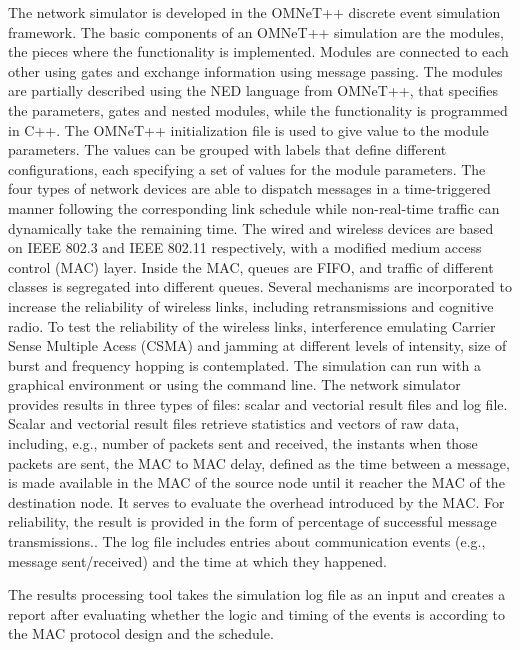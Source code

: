 \documentclass[conference]{IEEEtran}
\begin{document}
The network simulator is developed in the OMNeT++ discrete event simulation framework. The basic components of an OMNeT++ simulation are the modules, the pieces where the functionality is implemented. Modules are connected to each other using gates and exchange information using message passing. The modules are partially described using the NED language from OMNeT++, that specifies the parameters, gates and nested modules, while the functionality is programmed in C++. The OMNeT++ initialization file is used to give value to the module parameters. The values can be grouped with labels that define different configurations, each specifying a set of values for the module parameters. The four types of network devices are able to dispatch messages in a time-triggered manner following the corresponding link schedule while non-real-time traffic can dynamically take the remaining time. The wired and wireless devices are based on IEEE 802.3 and IEEE 802.11 respectively, with a modified medium access control (MAC) layer. Inside the MAC, queues are FIFO, and traffic of different classes is segregated into different queues. Several mechanisms are incorporated to increase the reliability of wireless links, including retransmissions and cognitive radio. To test the reliability of the wireless links, interference emulating Carrier Sense Multiple Acess (CSMA) and jamming at different levels of intensity, size of burst and frequency hopping is contemplated. The simulation can run with a graphical environment or using the command line. The network simulator provides results in three types of files: scalar and vectorial result files and log file. Scalar and vectorial result files retrieve statistics and vectors of raw data, including, e.g., number of packets sent and received, the instants when those packets are sent, the MAC to MAC delay, defined as the time between a message, is made available in the MAC of the source node until it reacher the MAC of the destination node. It serves to evaluate the overhead introduced by the MAC. For reliability, the result is provided in the form of percentage of successful message transmissions.. The log file includes entries about communication events (e.g., message sent/received) and the time at which they happened.

The results processing tool takes the simulation log file as an input and creates a report after evaluating whether the logic and timing of the events is according to the MAC protocol design and the schedule.

\end{document}
